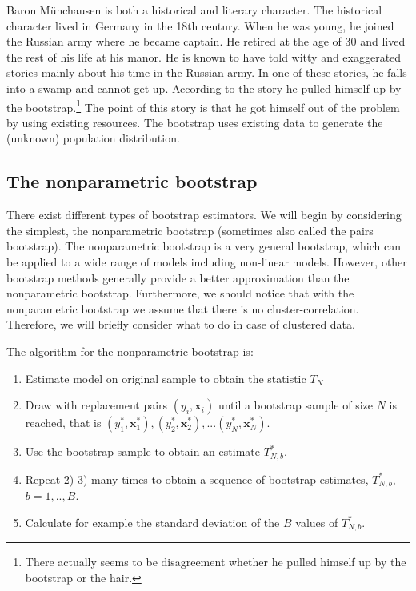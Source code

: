 \documentclass{article}
\begin{document}
Baron M\"{u}nchausen is both a historical and literary character. The
historical character lived in Germany in the 18th century. When he was
young, he joined the Russian army where he became captain. He retired at the
age of 30 and lived the rest of his life at his manor. He is known to have
told witty and exaggerated stories mainly about his time in the Russian
army. In one of these stories, he falls into a swamp and cannot get up.
According to the story he pulled himself up by the bootstrap.\footnote{%
There actually seems to be disagreement whether he pulled himself up by the
bootstrap or the hair.} The point of this story is that he got himself out
of the problem by using existing resources. The bootstrap uses existing data
to generate the (unknown) population distribution.

\subsection{The nonparametric bootstrap}

There exist different types of bootstrap estimators. We will begin by
considering the simplest, the nonparametric bootstrap (sometimes also called
the pairs bootstrap). The nonparametric bootstrap is a very general
bootstrap, which can be applied to a wide range of models including
non-linear models. However, other bootstrap methods generally provide a
better approximation than the nonparametric bootstrap. Furthermore, we
should notice that with the nonparametric bootstrap we assume that there is
no cluster-correlation. Therefore, we will briefly consider what to do in
case of clustered data.

The algorithm for the nonparametric bootstrap is:

\begin{enumerate}
\item Estimate model on original sample to obtain the statistic $T_{N}$

\item Draw with replacement pairs $\left( y_{i},\mathbf{x}_{i}\right) $
until a bootstrap sample of size $N$ is reached, that is $\left( y_{1}^{\ast
},\mathbf{x}_{1}^{\ast }\right) ,\left( y_{2}^{\ast },\mathbf{x}_{2}^{\ast
}\right) ,...\left( y_{N}^{\ast },\mathbf{x}_{N}^{\ast }\right) $.

\item Use the bootstrap sample to obtain an estimate $T_{N,b}^{\ast }$.

\item Repeat 2)-3) many times to obtain a sequence of bootstrap estimates, $%
T_{N,b}^{\ast }$, $b=1,..,B$.

\item Calculate for example the standard deviation of the $B$ values of $%
T_{N,b}^{\ast }$.
\end{enumerate}
\end{document}
